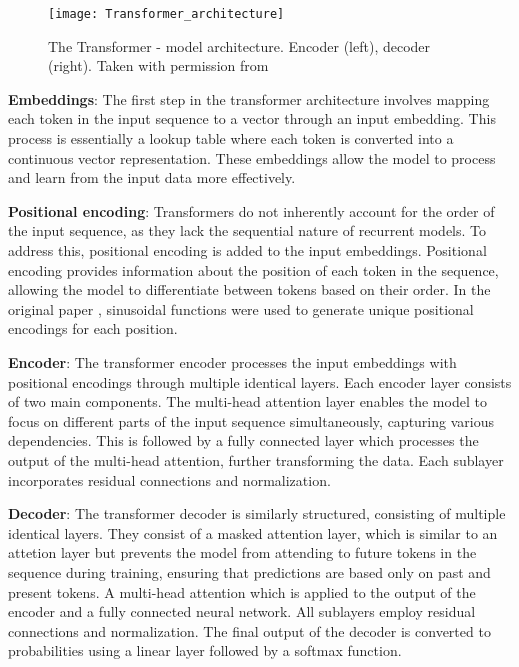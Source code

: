 \documentclass[../../thesis.tex]{subfiles}
\begin{document}
\begin{figure}[h]
    \texttt{[image: Transformer\_architecture]}
    \centering 
    \caption{The Transformer - model architecture. Encoder (left), decoder (right). Taken with permission from \cite{vaswani2023attention}}
    \label{fig:transformer}
\end{figure}


\textbf{Embeddings}: The first step in the transformer architecture involves mapping each token in the input sequence to a vector through an input embedding. This process is essentially a lookup table where each token is converted into a continuous vector representation. These embeddings allow the model to process and learn from the input data more effectively.
\newline

\textbf{Positional encoding}: Transformers do not inherently account for the order of the input sequence, as they lack the sequential nature of recurrent models. To address this, positional encoding is added to the input embeddings. Positional encoding provides information about the position of each token in the sequence, allowing the model to differentiate between tokens based on their order. In the original paper \cite{vaswani2023attention}, sinusoidal functions were used to generate unique positional encodings for each position.
\newline

\textbf{Encoder}: The transformer encoder processes the input embeddings with positional encodings through multiple identical layers. Each encoder layer consists of two main components. The multi-head attention layer enables the model to focus on different parts of the input sequence simultaneously, capturing various dependencies. This is followed by a fully connected layer which processes the output of the multi-head attention, further transforming the data. Each sublayer incorporates residual connections and normalization. 
\newline

\textbf{Decoder}: The transformer decoder is similarly structured, consisting of multiple identical layers. They consist of a masked attention layer, which is similar to an attetion layer but prevents the model from attending to future tokens in the sequence during training, ensuring that predictions are based only on past and present tokens. A multi-head attention which is applied to the output of the encoder and a fully connected neural network. All sublayers employ residual connections and normalization. The final output of the decoder is converted to probabilities using a linear layer followed by a softmax function.
\newline
\end{document}
